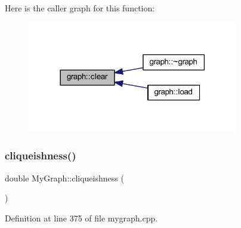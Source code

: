 Here is the caller graph for this function\+:\nopagebreak
\begin{figure}[H]
\begin{center}
\leavevmode
\includegraphics[width=261pt]{classgraph_a9ff5d6af3653e79f87b836701453f55a_icgraph}
\end{center}
\end{figure}
\mbox{\label{class_my_graph_a2bb131d5401dc66c01acb976daa7e981}} 
\subsubsection{\texorpdfstring{cliqueishness()}{cliqueishness()}}
{\footnotesize\ttfamily double My\+Graph\+::cliqueishness (\begin{DoxyParamCaption}{ }\end{DoxyParamCaption})\hspace{0.3cm}{\ttfamily [inherited]}}



Definition at line 375 of file mygraph.\+cpp.


